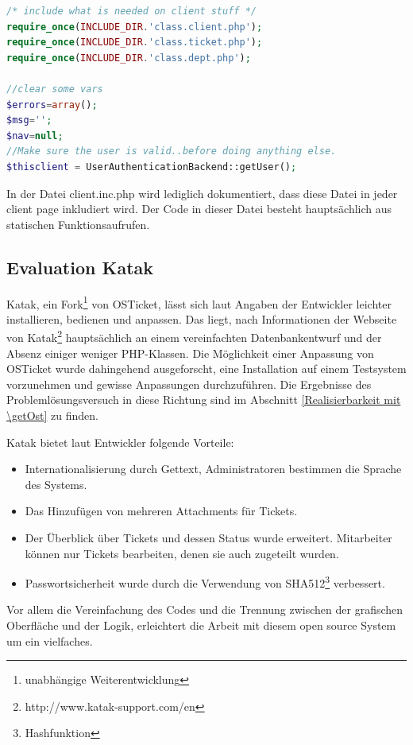 \begin{lstlisting}[language=PHP, caption=client.inc.php, firstnumber=38]
/* include what is needed on client stuff */
require_once(INCLUDE_DIR.'class.client.php');
require_once(INCLUDE_DIR.'class.ticket.php');
require_once(INCLUDE_DIR.'class.dept.php');

//clear some vars
$errors=array();
$msg='';
$nav=null;
//Make sure the user is valid..before doing anything else.
$thisclient = UserAuthenticationBackend::getUser();
\end{lstlisting}
In der Datei client.inc.php wird lediglich dokumentiert, dass diese Datei in jeder client page inkludiert wird. Der Code in dieser Datei besteht hauptsächlich aus statischen Funktionsaufrufen.

\subsection{Evaluation Katak}
Katak, ein Fork\footnote{unabhängige Weiterentwicklung} von OSTicket, lässt sich laut Angaben der Entwickler leichter installieren, bedienen und anpassen. Das liegt, nach Informationen der Webseite von Katak\footnote{http://www.katak-support.com/en} hauptsächlich an einem vereinfachten Datenbankentwurf und der Absenz einiger weniger PHP-Klassen. Die Möglichkeit einer Anpassung von OSTicket wurde dahingehend ausgeforscht, eine Installation auf einem Testsystem vorzunehmen und gewisse Anpassungen durchzuführen. Die Ergebnisse des Problemlösungsversuch in diese Richtung sind im Abschnitt \ref{Realisierbarkeit mit \getOst} zu finden.

Katak bietet laut Entwickler folgende Vorteile:
\begin{itemize}
	\item Internationalisierung durch Gettext, Administratoren bestimmen die Sprache des Systems.
	\item Das Hinzufügen von mehreren Attachments für Tickets.
	\item Der Überblick über Tickets und dessen Status wurde erweitert. Mitarbeiter können nur Tickets bearbeiten, denen sie auch zugeteilt wurden.
	\item Passwortsicherheit wurde durch die Verwendung von SHA512\footnote{Hashfunktion} verbessert.
\end{itemize}
Vor allem die Vereinfachung des Codes und die Trennung zwischen der grafischen Oberfläche und der Logik, erleichtert die Arbeit mit diesem open source System um ein vielfaches.
\newpage 

